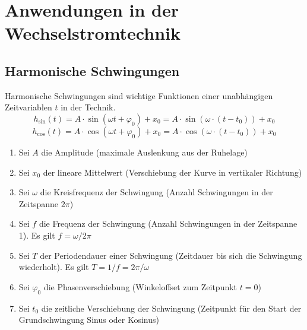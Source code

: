 \section{Anwendungen in der Wechselstromtechnik}
\subsection{Harmonische Schwingungen}
Harmonische Schwingungen sind wichtige Funktionen einer unabhängigen Zeitvariablen $t$ in der Technik. 
\begin{equation}
\boxed{h_{\text{sin}}\left(t\right)=A\cdot \sin\left(\omega t+\varphi_0\right)+x_0=A\cdot \sin\left(\omega\cdot \left(t-t_0\right)\right)+x_0}
\end{equation}
\begin{equation}
\boxed{h_{\text{cos}}\left(t\right)=A\cdot \cos\left(\omega t+\varphi_0\right)+x_0=A\cdot \cos\left(\omega\cdot \left(t-t_0\right)\right)+x_0}
\end{equation}
\begin{enumerate}[$(a)$]
\item Sei $A$ die Amplitude (maximale Auslenkung aus der Ruhelage)
\item Sei $x_0$ der lineare Mittelwert (Verschiebung der Kurve in vertikaler Richtung)
\item Sei $\omega$ die Kreisfrequenz der Schwingung (Anzahl Schwingungen in der Zeitspanne $2\pi$)
\item Sei $f$ die Frequenz der Schwingung (Anzahl Schwingungen in der Zeitspanne 1). Es gilt $f=\omega/2\pi$
\item Sei $T$ der Periodendauer einer Schwingung (Zeitdauer bis sich die Schwingung wiederholt). Es gilt $T=1/f=2\pi/\omega$
\item Sei $\varphi_0$ die Phasenverschiebung (Winkeloffset zum Zeitpunkt $t=0$)
\item Sei $t_0$ die zeitliche Verschiebung der Schwingung (Zeitpunkt für den Start der Grundschwingung Sinus oder Kosinus) 
\end{enumerate}
